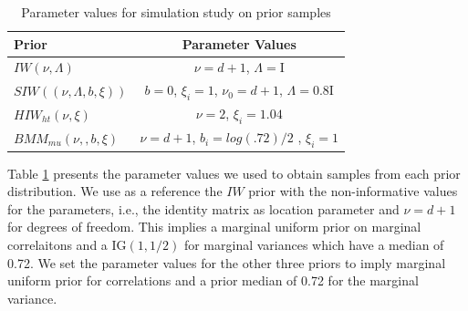 \documentclass[a4paper]{article}
\newcommand{\I}{\mathrm{I}}
\begin{document}
\begin{table}[htbp]
   \centering
    \caption{ Parameter values for simulation study on prior samples}
   \label{paramvals} 
   \begin{tabular}{ l|c}
   \hline
      Prior    &  Parameter Values \\ \hline
  $IW(\nu, \Lambda)$ &   $\nu=d+1$, $\Lambda=\I$ \\ 
  $SIW((\nu, \Lambda, b, \xi))$  & $b=0$, $\xi_i =1$,  $\nu_0= d + 1$, $\Lambda = 0.8\I$ \\
  $HIW_{ht}(\nu, \xi)$    &  $\nu=2$,  $\xi_i=1.04$ \\
   $BMM_{mu}(\nu,,b,\xi)$   &  $\nu=d+1$, $b_i=log(.72)/2$ , $\xi_i=1$ \\ \hline
   \end{tabular}
 \end{table}       

Table \ref{paramvals} presents the parameter values we used to obtain samples from each prior distribution. We use as a reference the $IW$ prior with the non-informative values for the parameters, i.e., the identity matrix as location parameter and $\nu=d+1$ for degrees of freedom. This implies a marginal uniform prior on marginal correlaitons and a IG$(1,1/2)$ for marginal variances which have a median of 0.72.  We set the parameter values for the other three priors to imply marginal uniform prior for correlations and a prior median of 0.72 for the marginal variance. 
\end{document}
